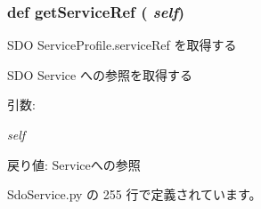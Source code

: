 \subsubsection{\setlength{\rightskip}{0pt plus 5cm}def getServiceRef ( {\em self})}\label{classsource__py_1_1_sdo_service_1_1_s_d_o_service_profile_cdf7a46c7b9862a69205aab9c05098f8}


SDO ServiceProfile.serviceRef を取得する 

SDO Service への参照を取得する

\begin{Desc}
\item[引数:]
\begin{description}
\item[{\em self}]\end{description}
\end{Desc}
\begin{Desc}
\item[戻り値:]Serviceへの参照 \end{Desc}


 SdoService.py の 255 行で定義されています。